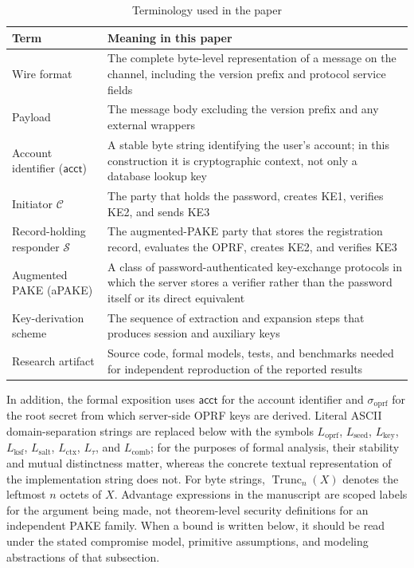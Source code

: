 \documentclass[preprint,12pt]{elsarticle}
\newcommand{\acct}{\mathsf{acct}}
\newcommand{\sigoprf}{\sigma_{\mathrm{oprf}}}
\newcommand{\Label}[1]{L_{\mathrm{#1}}}
\theoremstyle{remark}
\begin{document}
\begin{table}[htbp]
\caption{Terminology used in the paper}
\label{tab:terminology}
\centering\small
\begin{tabularx}{\textwidth}{@{}L{3.2cm}X@{}}
\toprule
Term & Meaning in this paper \\
\midrule
Wire format & The complete byte-level representation of a message on the channel, including the version prefix and protocol service fields \\
Payload & The message body excluding the version prefix and any external wrappers \\
Account identifier ($\acct$) & A stable byte string identifying the user's account; in this construction it is cryptographic context, not only a database lookup key \\
Initiator $\mathcal{C}$ & The party that holds the password, creates KE1, verifies KE2, and sends KE3 \\
Record-holding responder $\mathcal{S}$ & The augmented-PAKE party that stores the registration record, evaluates the OPRF, creates KE2, and verifies KE3 \\
Augmented PAKE (aPAKE) & A class of password-authenticated key-exchange protocols in which the server stores a verifier rather than the password itself or its direct equivalent \\
Key-derivation scheme & The sequence of extraction and expansion steps that produces session and auxiliary keys \\
Research artifact & Source code, formal models, tests, and benchmarks needed for independent reproduction of the reported results \\
\bottomrule
\end{tabularx}
\end{table}

In addition, the formal exposition uses $\acct$ for the account
identifier and $\sigoprf$ for the root secret from which server-side
OPRF keys are derived. Literal ASCII domain-separation strings are
replaced below with the symbols $\Label{oprf}$, $\Label{seed}$,
$\Label{key}$, $\Label{ksf}$, $\Label{salt}$, $\Label{ctx}$,
$L_{\tau}$, and $\Label{comb}$; for the purposes of formal analysis,
their stability and mutual distinctness matter, whereas the concrete
textual representation of the implementation string does not.
For byte strings, $\operatorname{Trunc}_n(X)$ denotes the leftmost
$n$ octets of $X$.
Advantage expressions in the manuscript are scoped labels for the
argument being made, not theorem-level security definitions for an
independent PAKE family. When a bound is written below, it should be read
under the stated compromise model, primitive assumptions, and modeling
abstractions of that subsection.
\end{document}
